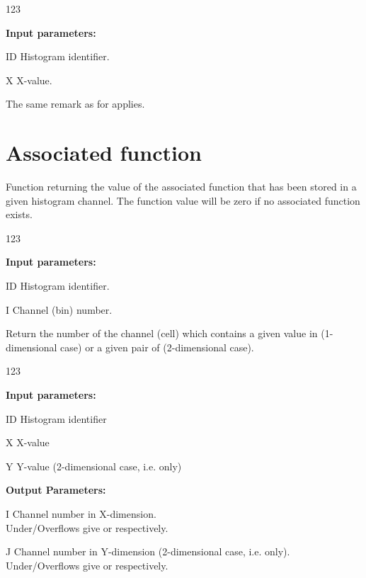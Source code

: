 \begin{DLtt}{123}
\item[{\rm\bf Input parameters:}]
\item[ID] Histogram identifier.
\item[X] X-value.
\end{DLtt}
The same remark as for  applies.
\newpage
 
\section{Associated function}
\label{HASSFUNC}
 
 
\Action
Function returning the value of the associated function that
has been stored in a given histogram channel. The function value will
be zero if no associated function exists.
 
\begin{DLtt}{123}
\item[{\rm\bf Input parameters:}]
\item[ID] Histogram identifier.
\item[I] Channel (bin) number.
\end{DLtt}
 
\label{HABSCNUM}

\par
 
 
\Action
Return the number of the channel (cell)
which contains a given value in  (1-dimensional case) or
a given pair of  (2-dimensional case).
 
\begin{DLtt}{123}
\item[{\rm\bf Input parameters:}]
\item[ID] Histogram identifier
\item[X] X-value
\item[Y] Y-value (2-dimensional case, i.e.  only)
\item[{\rm\bf Output Parameters:}]
\item[I] Channel number in X-dimension.\\
Under/Overflows give  or  respectively.
\item[J] Channel number in Y-dimension
(2-dimensional case, i.e.  only).\\
Under/Overflows give  or  respectively.
\end{DLtt}
 
